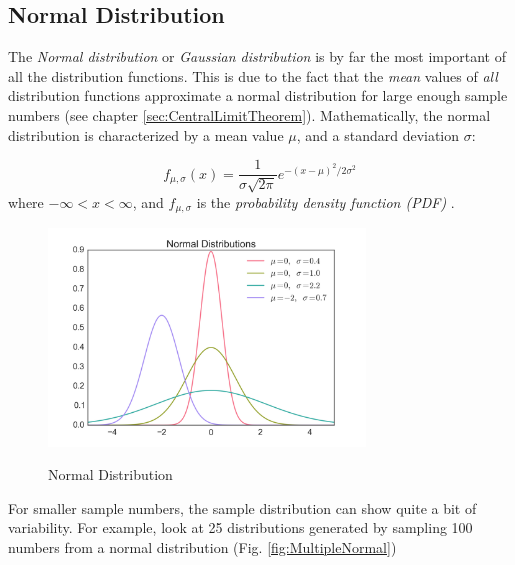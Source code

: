 \subsection{Normal Distribution} \label{sec:normalDistribution}

The \emph{Normal distribution} or \emph{Gaussian distribution} is by far the most important of all the distribution functions. This is due to the fact that the \emph{mean }values of \emph{all} distribution functions approximate a normal distribution for large enough sample numbers (see chapter \ref{sec:CentralLimitTheorem}).
Mathematically, the normal distribution is characterized by a mean value $\mu$, and a standard deviation $\sigma$:

\begin{equation}\label{eq_normal}
     f_{\mu,\sigma} (x) = \frac{1}{\sigma \sqrt{2 \pi}} e^{-( x - \mu )^2 /2 \sigma^2}
\end{equation}
where $ - \infty < x < \infty $, and $f_{\mu,\sigma}$ is the \emph{probability density function (PDF)} .

\begin{figure}
  \centering
  \includegraphics[width=0.75\textwidth]{../Images/Normal_Distribution_PDF.png}\\
  \caption{Normal Distribution}\label{fig:normal}
\end{figure}

For smaller sample numbers, the sample distribution can show quite a bit of variability. For example, look at 25 distributions generated by sampling 100 numbers from a normal distribution (Fig. \ref{fig:MultipleNormal})

